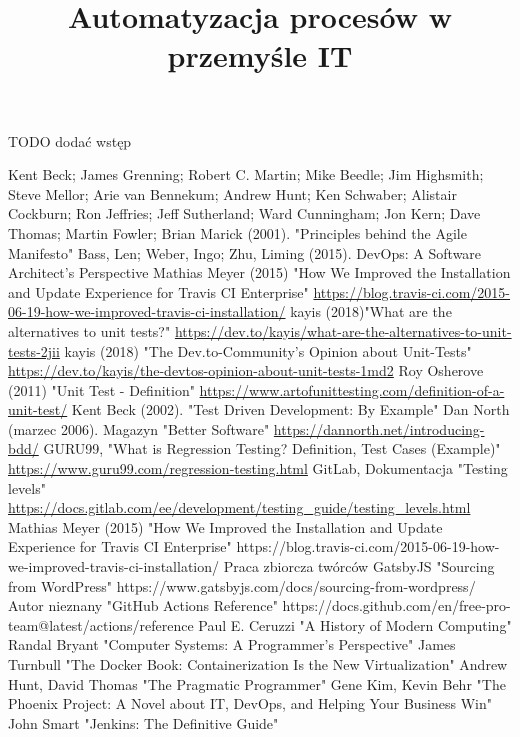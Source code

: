 \documentclass[twoside]{projektInzynierskiMS1}
\title{Automatyzacja procesów w przemyśle IT}
\begin{document}
TODO dodać wstęp









\begin{thebibliography}{12}

 Kent Beck; James Grenning; Robert C. Martin; Mike Beedle; Jim Highsmith; Steve Mellor; Arie van Bennekum; Andrew Hunt; Ken Schwaber; Alistair Cockburn; Ron Jeffries; Jeff Sutherland; Ward Cunningham; Jon Kern; Dave Thomas; Martin Fowler; Brian Marick (2001). "Principles behind the Agile Manifesto"
 Bass, Len; Weber, Ingo; Zhu, Liming (2015). DevOps: A Software Architect's Perspective
 Mathias Meyer (2015)  "How We Improved the Installation and Update Experience for Travis CI Enterprise" \url{https://blog.travis-ci.com/2015-06-19-how-we-improved-travis-ci-installation/}
 kayis (2018)"What are the alternatives to unit tests?" \url{https://dev.to/kayis/what-are-the-alternatives-to-unit-tests-2jii}
 kayis (2018) "The Dev.to-Community's Opinion about Unit-Tests" \url{https://dev.to/kayis/the-devtos-opinion-about-unit-tests-1md2}
 Roy Osherove (2011) "Unit Test - Definition" \url{https://www.artofunittesting.com/definition-of-a-unit-test/}
 Kent Beck (2002). "Test Driven Development: By Example"
 Dan North (marzec 2006). Magazyn "Better Software" \url{https://dannorth.net/introducing-bdd/}
 GURU99, "What is Regression Testing? Definition, Test Cases (Example)" \url{https://www.guru99.com/regression-testing.html}
 GitLab, Dokumentacja "Testing levels" \url{https://docs.gitlab.com/ee/development/testing\_guide/testing\_levels.html}
 Mathias Meyer (2015)  "How We Improved the Installation and Update Experience for Travis CI Enterprise" https://blog.travis-ci.com/2015-06-19-how-we-improved-travis-ci-installation/
 Praca zbiorcza twórców GatsbyJS "Sourcing from WordPress" https://www.gatsbyjs.com/docs/sourcing-from-wordpress/
 Autor nieznany "GitHub Actions Reference" https://docs.github.com/en/free-pro-team@latest/actions/reference
 Paul E. Ceruzzi "A History of Modern Computing"
 Randal Bryant "Computer Systems: A Programmer's Perspective"
 James Turnbull "The Docker Book: Containerization Is the New Virtualization"
 Andrew Hunt, David Thomas "The Pragmatic Programmer"
 Gene Kim, Kevin Behr "The Phoenix Project: A Novel about IT, DevOps, and Helping Your Business Win"
 John Smart "Jenkins: The Definitive Guide"

\end{thebibliography}
\end{document}
